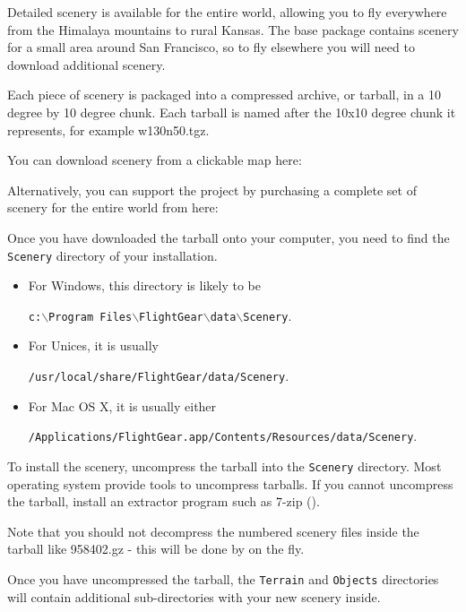 Detailed \FlightGear{} scenery is available for the entire world, allowing
you to fly everywhere from the Himalaya mountains to rural Kansas.
The \FlightGear{} base package contains scenery for a small area around San
Francisco, so to fly elsewhere you will need to download additional scenery.

Each piece of scenery is packaged into a compressed archive, or tarball, in
a 10 degree by 10 degree chunk. Each tarball is named after the 10x10 degree
chunk it represents, for example w130n50.tgz.

You can download scenery from a clickable map here:

\medskip
{}
\medskip

Alternatively, you can support the \FlightGear{} project by purchasing a complete
set of scenery for the entire world from here:

\medskip
{}
\medskip

Once you have downloaded the tarball onto your computer, you need to find the
\texttt{Scenery} directory of your \FlightGear{} installation.

\begin{itemize}
\item For Windows, this directory is likely to be

\texttt{c:$\backslash$Program Files$\backslash$FlightGear$\backslash$data$\backslash$Scenery}.
\item For Unices, it is usually

\texttt{/usr/local/share/FlightGear/data/Scenery}.
\item For Mac OS X, it is usually either

\texttt{/Applications/FlightGear.app/Contents/Resources/data/Scenery}.

\end{itemize}

To install the scenery, uncompress the tarball into the \texttt{Scenery}
directory. Most operating system provide tools to uncompress tarballs. If you cannot
uncompress the tarball, install an extractor program such as 7-zip
().

Note that you should not decompress the numbered scenery files inside the tarball like
958402.gz - this will be done by \FlightGear{} on the fly.

Once you have uncompressed the tarball, the \texttt{Terrain} and \texttt{Objects} directories
will contain additional sub-directories with your new scenery inside.

